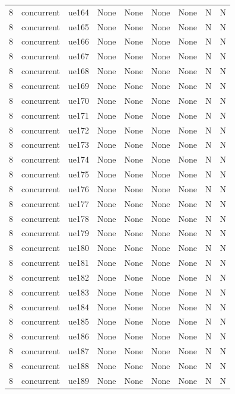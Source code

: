 \begin{table}[ht]
\begin{tabular}{|c|c|c|c|c|c|c|c|c|}
8 & concurrent & ue164 & None & None & None & None & N & N \\
8 & concurrent & ue165 & None & None & None & None & N & N \\
8 & concurrent & ue166 & None & None & None & None & N & N \\
8 & concurrent & ue167 & None & None & None & None & N & N \\
8 & concurrent & ue168 & None & None & None & None & N & N \\
8 & concurrent & ue169 & None & None & None & None & N & N \\
8 & concurrent & ue170 & None & None & None & None & N & N \\
8 & concurrent & ue171 & None & None & None & None & N & N \\
8 & concurrent & ue172 & None & None & None & None & N & N \\
8 & concurrent & ue173 & None & None & None & None & N & N \\
8 & concurrent & ue174 & None & None & None & None & N & N \\
8 & concurrent & ue175 & None & None & None & None & N & N \\
8 & concurrent & ue176 & None & None & None & None & N & N \\
8 & concurrent & ue177 & None & None & None & None & N & N \\
8 & concurrent & ue178 & None & None & None & None & N & N \\
8 & concurrent & ue179 & None & None & None & None & N & N \\
8 & concurrent & ue180 & None & None & None & None & N & N \\
8 & concurrent & ue181 & None & None & None & None & N & N \\
8 & concurrent & ue182 & None & None & None & None & N & N \\
8 & concurrent & ue183 & None & None & None & None & N & N \\
8 & concurrent & ue184 & None & None & None & None & N & N \\
8 & concurrent & ue185 & None & None & None & None & N & N \\
8 & concurrent & ue186 & None & None & None & None & N & N \\
8 & concurrent & ue187 & None & None & None & None & N & N \\
8 & concurrent & ue188 & None & None & None & None & N & N \\
8 & concurrent & ue189 & None & None & None & None & N & N \\

\end{tabular}
\end{table}
